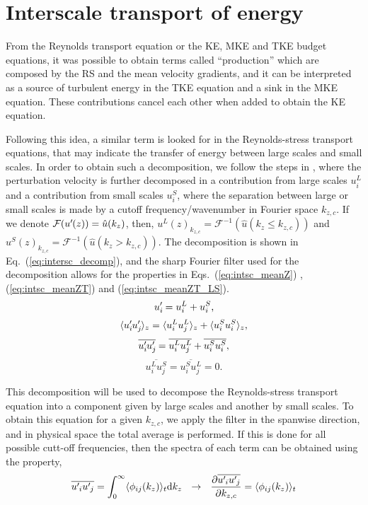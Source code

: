 
\section{Interscale transport of energy}

From the Reynolds transport equation or the KE, MKE and TKE budget equations, it was possible to obtain terms called ``production'' which are composed by the RS and the mean velocity gradients, and it can be interpreted as a source of turbulent energy in the TKE equation and a sink in the MKE equation. These contributions cancel each other when added to obtain the KE equation.

Following this idea, a similar term is looked for in the Reynolds-stress transport equations, that may indicate the transfer of energy between large scales and small scales.
In order to obtain such a decomposition, we follow the steps in \cite{PRL2018_Kawata, JFM2019_kawata_alfredsson}, where the perturbation velocity is further decomposed in a contribution from large scales $u_i^L$ and a contribution from small scales $u_i^S$, where the separation between large or small scales is made by a cutoff frequency/wavenumber in Fourier space $k_{z,c}$. If we denote $\mathcal{F}(u^{\prime}\mkern-1.2mu(z)) = \hat{u}(k_z)$, then, $u^L(z)_{k_{z,c}} = \mathcal{F}^{-1}( \hat{u}(k_z \le k_{z,c}) ) $ and $u^S(z)_{k_{z,c}} = \mathcal{F}^{-1}( \hat{u}(k_z > k_{z,c}) ) $.
The decomposition is shown in Eq.~(\ref{eq:intersc_decomp}), and the sharp Fourier filter used for the decomposition allows for the properties in Eqs.~(\ref{eq:intsc_meanZ}) , (\ref{eq:intsc_meanZT}) and (\ref{eq:intsc_meanZT_LS}). 
\begin{equation}
    \label{eq:intersc_decomp}
    u_i^{\prime}\mkern-1.2mu = u_i^L + u_i^S,
\end{equation}
\begin{equation}
    \label{eq:intsc_meanZ}
    \langle u_i^{\prime}\mkern-1.2mu u_j^{\prime}\mkern-1.2mu \rangle_z = 
    \langle u_i^L u_j^L \rangle_z + 
    \langle u_i^S u_i^S \rangle_z ,
\end{equation}
\begin{equation}
    \label{eq:intsc_meanZT}
    \overline{u_i^{\prime}\mkern-1.2mu u_j^{\prime}\mkern-1.2mu} = 
    \overline{ u_i^L u_j^L} + 
    \overline{ u_i^S u_i^S} ,
\end{equation}
\begin{equation}
    \label{eq:intsc_meanZT_LS}
    \overline{ u_i^L u_j^S} = 
    \overline{ u_i^S u_j^L} = 0 .
\end{equation}

This decomposition will be used to decompose the Reynolds-stress transport equation into a component given by large scales and another by small scales. To obtain this equation for a given $k_{z,c}$, we apply the filter in the spanwise direction, and in physical space the total average is performed. If this is done for all possible cutt-off frequencies, then the spectra of each term can be obtained using the property,
\begin{equation}
    \label{eq:intsc_der_spec}
    \overline{u^{\prime}\mkern-1.2mu_i u^{\prime}\mkern-1.2mu_j}  = \int_{0}^{\infty} \langle \phi_{ij}(k_z) \rangle_t \mathrm{d}k_z  ~~ \rightarrow ~~ 
    \pdv{\overline{u^{\prime}\mkern-1.2mu_i u^{\prime}\mkern-1.2mu_j}}{k_{z,c}} = \langle \phi_{ij}(k_z) \rangle_t
\end{equation}

